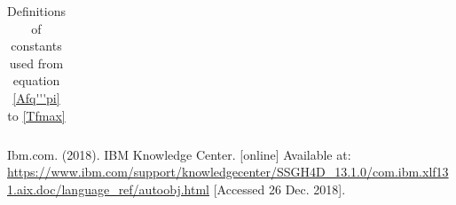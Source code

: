 \documentclass[a4paper, 12pt]{article}
\begin{document}
\begin{appendices}
\begin{table}[h!b]
\begin{tabular}{llll}
\end{tabular}
\caption{Definitions of constants used from equation \ref{Afq'''pi} to \ref{Tfmax}}\label{table2}
\end{table}

\end{appendices}

\begin{thebibliography}{1}
Ibm.com. (2018). IBM Knowledge Center. [online] Available at: \url{https://www.ibm.com/support/knowledgecenter/SSGH4D_13.1.0/com.ibm.xlf131.aix.doc/language_ref/autoobj.html} [Accessed 26 Dec. 2018].
\end  {thebibliography}

\end{document}
